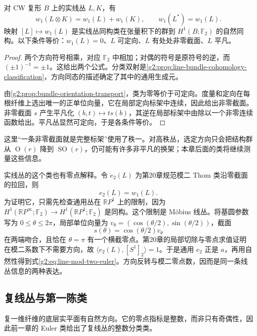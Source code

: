 \begin{proposition}\label{g2:prop:real-line-first-class}
	对 CW 复形 \(B\) 上的实线丛 \(L,K\)，有
	\[
		w_1(L\otimes K)=w_1(L)+w_1(K),\qquad w_1(L^*)=w_1(L).
	\]
	映射 \([L]\mapsto w_1(L)\) 是实线丛同构类在张量积下的群到 \(H^1(B;\mathbb F_2)\) 的自然同构。以下条件等价：\(w_1(L)=0\)、\(L\) 可定向、\(L\) 有处处非零截面、\(L\) 平凡。
\end{proposition}
\begin{proof}
	两个方向符号相乘，对应 \(\mathbb F_2\) 中相加；对偶的符号是原符号的逆，而 \((\pm1)^{-1}=\pm1\)。这给出两个公式。分类双射是\cref{g2:prop:line-bundle-cohomology-classification}，方向同态的描述确定了其中的通用生成元。

	由\cref{g2:prop:bundle-orientation-transport}，类为零等价于可定向。度量和定向在每根纤维上选出唯一的正单位向量，它在局部定向标架中连续，因此给出非零截面。非零截面 \(s\) 产生平凡化 \((b,t)\mapsto t s(b)\)，其逆在局部标架中由除以一个非零连续函数给出。平凡丛显然可定向，于是各条件等价。
\end{proof}

这里“一条非零截面就是完整标架”使用了秩一。对高秩丛，选定方向只会把结构群从 \(\operatorname O(r)\) 降到 \(\operatorname{SO}(r)\)，仍可能有许多非平凡的换架；本章后面的类将继续测量这些信息。

\ProseParagraphBreak

实线丛的这个类也有零点解释。令 \(e_2(L)\) 为第20章规范模二 Thom 类沿零截面的拉回，则
\begin{equation}\label{g2:eq:line-mod-two-euler}
	e_2(L)=w_1(L).
\end{equation}
为证明它，只需先检查通用丛在 \(\mathbb RP^1\) 上的限制，因为 \(H^1(\mathbb RP^\infty;\mathbb F_2)\to H^1(\mathbb RP^1;\mathbb F_2)\) 是同构。这个限制是 Möbius 线丛。将基圆参数写为 \(0\le\theta\le2\pi\)，局部单位向量为 \(v_\theta=(\cos(\theta/2),\sin(\theta/2))\)，截面
\[
	s(\theta)=\cos(\theta/2)v_\theta
\]
在两端吻合，且恰在 \(\theta=\pi\) 有一个横截零点。第20章的局部切除与零点求值证明在模二系数下不需要方向，故 \(\langle e_2(L),[S^1]_2\rangle=1\)。于是通用 \(e_2\) 正是 \(a\)，再用自然性得到式\eqref{g2:eq:line-mod-two-euler}。方向反转与模二零点数，因而是同一条线丛信息的两种表达。

\subsection{复线丛与第一陈类}
\label{g2:subsec:2101:02}
复一维纤维的底层实平面有自然方向。它的零点指标是整数，而非只有奇偶性，因此前一章的 Euler 类给出了复线丛的整数分类类。

